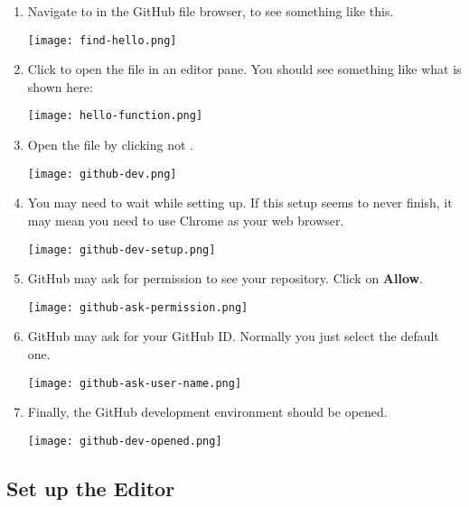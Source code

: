 \begin{enumerate}
\item Navigate to  in the GitHub file browser, to see something like this.
  
\nopagebreak
\noindent\texttt{[image: find-hello.png]}



\item Click  to open the file in an editor pane.  You
  should see something like what is shown here:
  
\nopagebreak
\noindent\texttt{[image: hello-function.png]}


\item Open the file by clicking  not .
  
\nopagebreak
\noindent\texttt{[image: github-dev.png]}


\item You may need to wait while setting up. If this setup seems to
  never finish, it may mean you need to use Chrome as your web
  browser.
  
\nopagebreak
\noindent\texttt{[image: github-dev-setup.png]}


\item GitHub may ask for permission to see your repository.  Click on \textbf{Allow}.
  
  \nopagebreak
\noindent\texttt{[image: github-ask-permission.png]}
  

\item GitHub may ask for your GitHub ID.  Normally you just select the default one.
  
  \nopagebreak
\noindent\texttt{[image: github-ask-user-name.png]}

\item Finally, the GitHub development environment should be opened.
  
  \nopagebreak
\noindent\texttt{[image: github-dev-opened.png]}



\end{enumerate}

\subsection{Set up the Editor}
  
